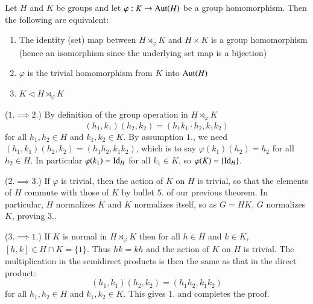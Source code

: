 \documentclass[12pt, a4paper, twoside, openright, titlepage]{book}
\begin{document}
\begin{prop}{}{}
    Let $H$ and $K$ be groups and let $\varphi:K\rightarrow \operatorname{Aut}(H)$ be a group homomorphism. Then the following are equivalent: \begin{enumerate}
        \item The identity (set) map between $H\rtimes_{\varphi}K$ and $H\times K$ is a group homomorphism (hence an isomorphism since the underlying set map is a bijection)
        \item $\varphi$ is the trivial homomorphism from $K$ into $\operatorname{Aut}(H)$
        \item $K\vartriangleleft H\rtimes_{\varphi}K$
    \end{enumerate}
\end{prop}
\begin{proof*}{}{}
    ($1.\implies 2.$) By definition of the group operation in $H\rtimes_{\varphi}K$ \begin{equation*}
        (h_1,k_1)(h_2,k_2) = (h_1k_1\cdot h_2,k_1k_2)
    \end{equation*}
    for all $h_1,h_2 \in H$ and $k_1,k_2 \in K$. By assumption $1.$, we need $(h_1,k_1)(h_2,k_2)=(h_1h_2,k_1k_2)$, which is to say $\varphi(k_1)(h_2) = h_2$ for all $h_2 \in H$. In particular $\varphi(k_1) = \operatorname{Id}_H$ for all $k_1 \in K$, so $\varphi(K) = \{\operatorname{Id}_H\}$.

    ($2.\implies 3.$) If $\varphi$ is trivial, then the action of $K$ on $H$ is trivial, so that the elements of $H$ commute with those of $K$ by bullet $5.$ of our previous theorem. In particular, $H$ normalizes $K$ and $K$ normalizes itself, so as $G = HK$, $G$ normalizes $K$, proving $3.$.
    

    ($3.\implies 1.$) If $K$ is normal in $H \rtimes_{\varphi} K$ then for all $h \in H$ and $k \in K$, $[h,k] \in H\cap K = \{1\}$. Thus $hk = kh$ and the action of $K$ on $H$ is trivial. The multiplication in the semidirect products is then the same as that in the direct product: \begin{equation*}
        (h_1,k_1)(h_2,k_2) = (h_1h_2,k_1k_2)
    \end{equation*}
    for all $h_1,h_2 \in H$ and $k_1,k_2 \in K$. This gives $1.$ and completes the proof.
\end{proof*}
\end{document}
